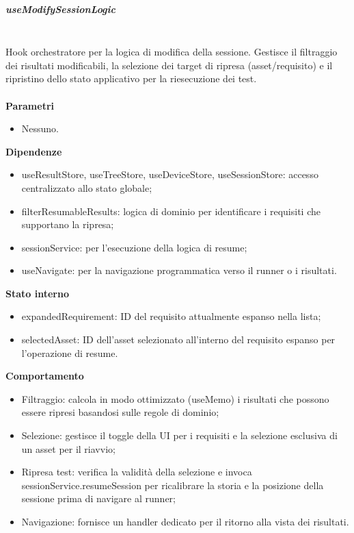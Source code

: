 \documentclass[a4paper,12pt]{article}
\begin{document}
                \subparagraph{useModifySessionLogic}\mbox{}\\
                Hook orchestratore per la logica di modifica della sessione. Gestisce il filtraggio dei risultati modificabili, la selezione dei target di ripresa (asset/requisito) e il ripristino dello stato applicativo per la riesecuzione dei test.\\\\
                \textbf{Parametri}
                \begin{itemize}
                    \item Nessuno.
                \end{itemize}
                \textbf{Dipendenze}
                \begin{itemize}
                    \item {\ttfamily useResultStore}, {\ttfamily useTreeStore}, {\ttfamily useDeviceStore}, {\ttfamily useSessionStore}: accesso centralizzato allo stato globale;
                    \item {\ttfamily filterResumableResults}: logica di dominio per identificare i requisiti che supportano la ripresa;
                    \item {\ttfamily sessionService}: per l'esecuzione della logica di {\ttfamily resume};
                    \item {\ttfamily useNavigate}: per la navigazione programmatica verso il runner o i risultati.
                \end{itemize}
                \textbf{Stato interno}
                \begin{itemize}
                    \item {\ttfamily expandedRequirement}: ID del requisito attualmente espanso nella lista;
                    \item {\ttfamily selectedAsset}: ID dell'asset selezionato all'interno del requisito espanso per l'operazione di {\ttfamily resume}.
                \end{itemize}
                \textbf{Comportamento}
                \begin{itemize}
                    \item Filtraggio: calcola in modo ottimizzato ({\ttfamily useMemo}) i risultati che possono essere ripresi basandosi sulle regole di dominio;
                    \item Selezione: gestisce il toggle della UI per i requisiti e la selezione esclusiva di un asset per il riavvio;
                    \item Ripresa test: verifica la validità della selezione e invoca {\ttfamily sessionService.resumeSession} per ricalibrare la storia e la posizione della sessione prima di navigare al runner;
                    \item Navigazione: fornisce un handler dedicato per il ritorno alla vista dei risultati.
                \end{itemize}
\end{document}
